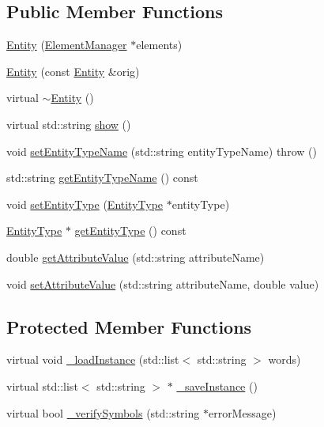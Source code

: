 \subsection*{Public Member Functions}
\begin{DoxyCompactItemize}
\item 
\hyperlink{class_entity_a4e83017c50e1b0fd5d3bd5a915e1e1a5}{Entity} (\hyperlink{class_element_manager}{Element\+Manager} $\ast$elements)
\item 
\hyperlink{class_entity_a9de139ff12775dd95fb80bec08247de7}{Entity} (const \hyperlink{class_entity}{Entity} \&orig)
\item 
virtual \hyperlink{class_entity_adf6d3f7cb1b2ba029b6b048a395cc8ae}{$\sim$\+Entity} ()
\item 
virtual std\+::string \hyperlink{class_entity_a86cc324050b451b31b134943e7978e36}{show} ()
\item 
void \hyperlink{class_entity_a920ed2c77ccc8726aeecd9fd9ff8955c}{set\+Entity\+Type\+Name} (std\+::string entity\+Type\+Name)  throw ()
\item 
std\+::string \hyperlink{class_entity_a860a6385aa2af6b8d205a8e3ea912c38}{get\+Entity\+Type\+Name} () const 
\item 
void \hyperlink{class_entity_a4f0e7975687368ca429a9ec94884350f}{set\+Entity\+Type} (\hyperlink{class_entity_type}{Entity\+Type} $\ast$entity\+Type)
\item 
\hyperlink{class_entity_type}{Entity\+Type} $\ast$ \hyperlink{class_entity_af95c4453cffb8817e5bdc17068714885}{get\+Entity\+Type} () const 
\item 
double \hyperlink{class_entity_aed93eae1f252705e713dd7f8019ace35}{get\+Attribute\+Value} (std\+::string attribute\+Name)
\item 
void \hyperlink{class_entity_ad1a2bc190ef151a4a5c7eff902ee468d}{set\+Attribute\+Value} (std\+::string attribute\+Name, double value)
\end{DoxyCompactItemize}
\subsection*{Protected Member Functions}
\begin{DoxyCompactItemize}
\item 
virtual void \hyperlink{class_entity_a51972e626aef5f92a10d5f800e323237}{\+\_\+load\+Instance} (std\+::list$<$ std\+::string $>$ words)
\item 
virtual std\+::list$<$ std\+::string $>$ $\ast$ \hyperlink{class_entity_a1569ba1b09e70e4769c5f02f611a8c61}{\+\_\+save\+Instance} ()
\item 
virtual bool \hyperlink{class_entity_a5a5fc79267b3671839597c99f8630a87}{\+\_\+verify\+Symbols} (std\+::string $\ast$error\+Message)
\end{DoxyCompactItemize}
